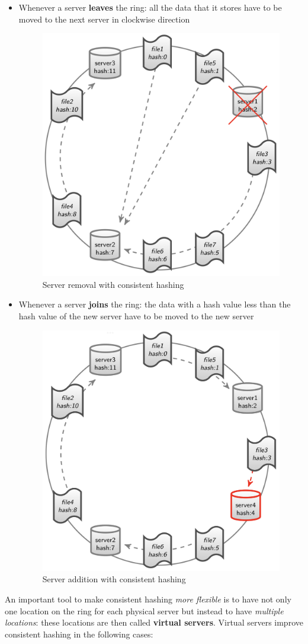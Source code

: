 \begin{itemize}
    \item Whenever a server \textbf{leaves} the ring: all the data that it stores have to be moved to the next server in clockwise direction
    \begin{figure}[!h]
        \centering
        \includegraphics[width=0.4\linewidth]{images/AdvancedDataManagment/data_fragmentation/server_removal.jpeg}
        \caption{Server removal with consistent hashing}
    \end{figure}
    \newpage
    \item Whenever a server \textbf{joins} the ring: the data with a hash value less than the hash value of the new server have to be moved to the new server
    \begin{figure}[!h]
        \centering
        \includegraphics[width=0.4\linewidth]{images/AdvancedDataManagment/data_fragmentation/server_addition.jpeg}
        \caption{Server addition with consistent hashing}
    \end{figure}
\end{itemize}
An important tool to make consistent hashing \textit{more flexible} is to have not only one location on the ring for each physical server but instead to have \textit{multiple locations}: these locations are then called \textbf{virtual servers}. Virtual servers improve consistent hashing in the following cases:
